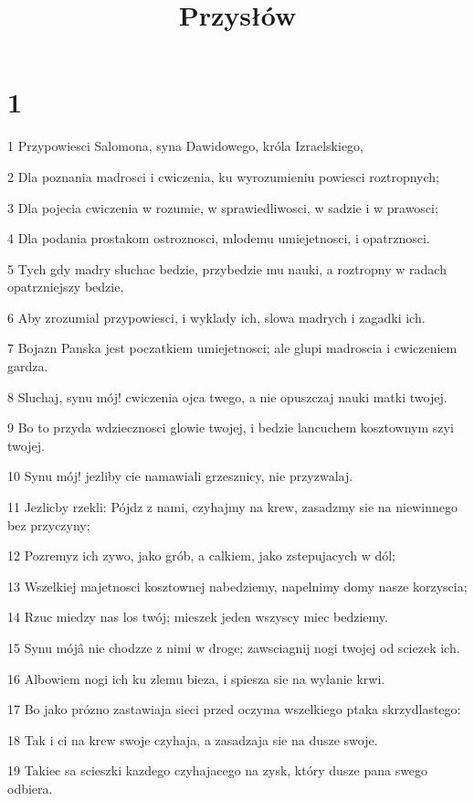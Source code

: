 

\title{Przysłów}


\chapter{1}

\par 1 Przypowiesci Salomona, syna Dawidowego, króla Izraelskiego,
\par 2 Dla poznania madrosci i cwiczenia, ku wyrozumieniu powiesci roztropnych;
\par 3 Dla pojecia cwiczenia w rozumie, w sprawiedliwosci, w sadzie i w prawosci;
\par 4 Dla podania prostakom ostroznosci, mlodemu umiejetnosci, i opatrznosci.
\par 5 Tych gdy madry sluchac bedzie, przybedzie mu nauki, a roztropny w radach opatrzniejszy bedzie,
\par 6 Aby zrozumial przypowiesci, i wyklady ich, slowa madrych i zagadki ich.
\par 7 Bojazn Panska jest poczatkiem umiejetnosci; ale glupi madroscia i cwiczeniem gardza.
\par 8 Sluchaj, synu mój! cwiczenia ojca twego, a nie opuszczaj nauki matki twojej.
\par 9 Bo to przyda wdziecznosci glowie twojej, i bedzie lancuchem kosztownym szyi twojej.
\par 10 Synu mój! jezliby cie namawiali grzesznicy, nie przyzwalaj.
\par 11 Jezlicby rzekli: Pójdz z nami, czyhajmy na krew, zasadzmy sie na niewinnego bez przyczyny;
\par 12 Pozremyz ich zywo, jako grób, a calkiem, jako zstepujacych w dól;
\par 13 Wszelkiej majetnosci kosztownej nabedziemy, napelnimy domy nasze korzyscia;
\par 14 Rzuc miedzy nas los twój; mieszek jeden wszyscy miec bedziemy.
\par 15 Synu mójâ nie chodzze z nimi w droge; zawsciagnij nogi twojej od sciezek ich.
\par 16 Albowiem nogi ich ku zlemu bieza, i spiesza sie na wylanie krwi.
\par 17 Bo jako prózno zastawiaja sieci przed oczyma wszelkiego ptaka skrzydlastego:
\par 18 Tak i ci na krew swoje czyhaja, a zasadzaja sie na dusze swoje.
\par 19 Takiec sa scieszki kazdego czyhajacego na zysk, który dusze pana swego odbiera.
